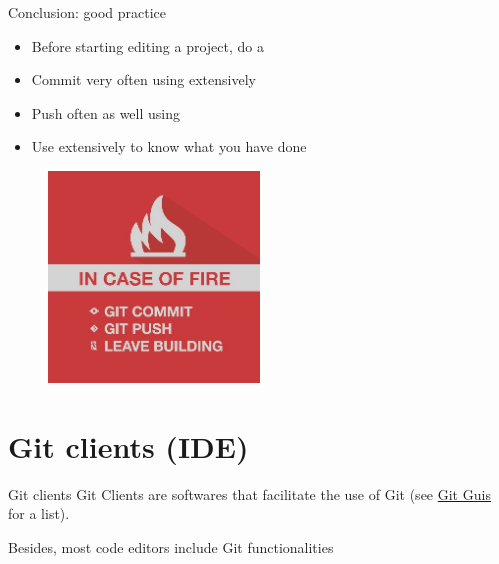 \documentclass[10pt]{beamer}
\begin{document}
\begin{frame}[fragile]{Conclusion: good practice}
\protect\hypertarget{conclusion-good-practice}{}
\begin{itemize}
\item
  Before starting editing a project, do a 
\item
  Commit very often using  extensively
\item
  Push often as well using 
\item
  Use  extensively to know what you have done
\end{itemize}

\begin{figure}

{\centering \includegraphics[width=0.5\textwidth]{img/funny.jpg}

}

\end{figure}
\end{frame}

\section{Git clients (IDE)}

\begin{frame}{Git clients}
\protect\hypertarget{git-clients}{}
Git Clients are softwares that facilitate the use of Git (see
\href{https://git-scm.com/downloads/guis}{Git Guis} for a list).

Besides, most code editors include Git functionalities
\end{frame}
\end{document}
